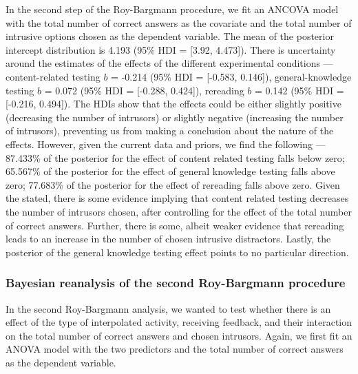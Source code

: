 \documentclass[11pt,]{article}
\begin{document}
In the second step of the Roy-Bargmann procedure, we fit an ANCOVA model
with the total number of correct answers as the covariate and the total
number of intrusive options chosen as the dependent variable. The mean
of the posterior intercept distribution is 4.193 (95\% HDI = {[}3.92,
4.473{]}). There is uncertainty around the estimates of the effects of
the different experimental conditions --- content-related testing \(b\)
= -0.214 (95\% HDI = {[}-0.583, 0.146{]}), general-knowledge testing
\(b\) = 0.072 (95\% HDI = {[}-0.288, 0.424{]}), rereading \(b\) = 0.142
(95\% HDI = {[}-0.216, 0.494{]}). The HDIs show that the effects could
be either slightly positive (decreasing the number of intrusors) or
slightly negative (increasing the number of intrusors), preventing us
from making a conclusion about the nature of the effects. However, given
the current data and priors, we find the following --- 87.433\% of the
posterior for the effect of content related testing falls below zero;
65.567\% of the posterior for the effect of general knowledge testing
falls above zero; 77.683\% of the posterior for the effect of rereading
falls above zero. Given the stated, there is some evidence implying that
content related testing decreases the number of intrusors chosen, after
controlling for the effect of the total number of correct answers.
Further, there is some, albeit weaker evidence that rereading leads to
an increase in the number of chosen intrusive distractors. Lastly, the
posterior of the general knowledge testing effect points to no
particular direction.

\hypertarget{bayesian-reanalysis-of-the-second-roy-bargmann-procedure}{%
\subsubsection{Bayesian reanalysis of the second Roy-Bargmann
procedure}\label{bayesian-reanalysis-of-the-second-roy-bargmann-procedure}}

In the second Roy-Bargmann analysis, we wanted to test whether there is
an effect of the type of interpolated activity, receiving feedback, and
their interaction on the total number of correct answers and chosen
intrusors. Again, we first fit an ANOVA model with the two predictors
and the total number of correct answers as the dependent variable.
\end{document}
